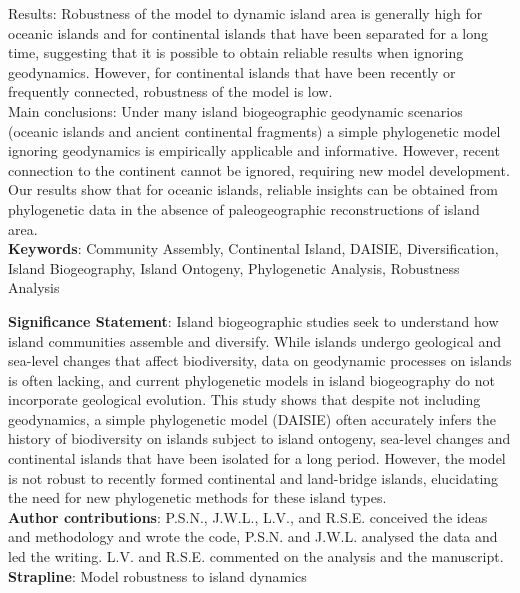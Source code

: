 \documentclass{article}
\begin{document}
\noindent Results: Robustness of the model to dynamic island area is generally high for oceanic islands and for continental islands that have been separated for a long time, suggesting that it is possible to obtain reliable results when ignoring geodynamics. However, for continental islands that have been recently or frequently connected, robustness of the model is low. \\

\noindent Main conclusions: Under many island biogeographic geodynamic scenarios (oceanic islands and ancient continental fragments) a simple phylogenetic model ignoring geodynamics is empirically applicable and informative. However, recent connection to the continent cannot be ignored, requiring new model development. Our results show that for oceanic islands, reliable insights can be obtained from phylogenetic data in the absence of paleogeographic reconstructions of island area. \\

\noindent \textbf{Keywords}: Community Assembly, Continental Island, DAISIE, Diversification, Island Biogeography, Island Ontogeny, Phylogenetic Analysis, Robustness Analysis \\

\clearpage

\noindent \textbf{Significance Statement}: Island biogeographic studies seek to understand how island communities assemble and diversify. While islands undergo geological and sea-level changes that affect biodiversity, data on geodynamic processes on islands is often lacking, and current phylogenetic models in island biogeography do not incorporate geological evolution. This study shows that despite not including geodynamics, a simple phylogenetic model (DAISIE) often accurately infers the history of biodiversity on islands subject to island ontogeny, sea-level changes and continental islands that have been isolated for a long period. However, the model is not robust to recently formed continental and land-bridge islands, elucidating the need for new phylogenetic methods for these island types. \\

\noindent \textbf{Author contributions}: P.S.N., J.W.L., L.V., and R.S.E. conceived the ideas and methodology and wrote the code, P.S.N. and J.W.L. analysed the data and led the writing. L.V. and R.S.E. commented on the analysis and the manuscript.\\

\noindent \textbf{Strapline}: Model robustness to island dynamics
\end{document}

